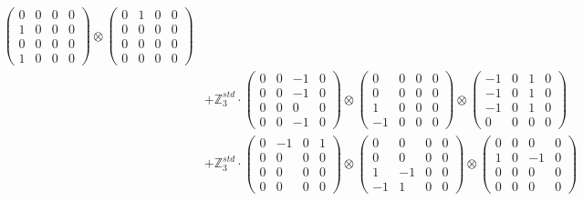 \documentclass{article}
\begin{document}
{\begin{align}
            \begin{pmatrix} 0 & 0 & 0 & 0 \\ 1 & 0 & 0 & 0 \\ 0 & 0 & 0 & 0 \\ 1 & 0 & 0 & 0 \end{pmatrix} \otimes 
            \begin{pmatrix} 0 & 1 & 0 & 0 \\ 0 & 0 & 0 & 0 \\ 0 & 0 & 0 & 0 \\ 0 & 0 & 0 & 0 \end{pmatrix} \\ 
        &+ \label{Rs16-Rc11-Solution-25-c20} \mathbb{Z}_3^{std} \cdot 
            \begin{pmatrix} 0 & 0 & -1 & 0 \\ 0 & 0 & -1 & 0 \\ 0 & 0 & 0 & 0 \\ 0 & 0 & -1 & 0 \end{pmatrix} \otimes 
            \begin{pmatrix} 0 & 0 & 0 & 0 \\ 0 & 0 & 0 & 0 \\ 1 & 0 & 0 & 0 \\ -1 & 0 & 0 & 0 \end{pmatrix} \otimes 
            \begin{pmatrix} -1 & 0 & 1 & 0 \\ -1 & 0 & 1 & 0 \\ -1 & 0 & 1 & 0 \\ 0 & 0 & 0 & 0 \end{pmatrix} \\ 
        &+ \label{Rs16-Rc11-Solution-25-c21} \mathbb{Z}_3^{std} \cdot 
            \begin{pmatrix} 0 & -1 & 0 & 1 \\ 0 & 0 & 0 & 0 \\ 0 & 0 & 0 & 0 \\ 0 & 0 & 0 & 0 \end{pmatrix} \otimes 
            \begin{pmatrix} 0 & 0 & 0 & 0 \\ 0 & 0 & 0 & 0 \\ 1 & -1 & 0 & 0 \\ -1 & 1 & 0 & 0 \end{pmatrix} \otimes 
            \begin{pmatrix} 0 & 0 & 0 & 0 \\ 1 & 0 & -1 & 0 \\ 0 & 0 & 0 & 0 \\ 0 & 0 & 0 & 0 \end{pmatrix} \\ 

\end{align}}
\end{document}
